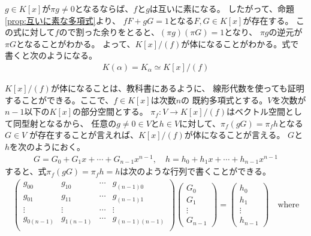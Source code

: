{	$g\in K[x]$が$\pi g\neq 0$となるならば、$f$と$g$は互いに素になる。
	したがって、命題\ref{prop:互いに素な多項式}より、
	$fF+gG=1$となる$F,G\in K[x]$が存在する。
	この式に対して$f$ので割った余りをとると、$(\pi g)(\pi G)=1$となり、
	$\pi g$の逆元が$\pi G$となることがわかる。
	よって、$K[x]/(f)$が体になることがわかる。式で書くと次のようになる。
	\begin{equation*}\begin{split}
		K(\alpha)=K_\alpha\simeq K[x]/(f)
	\end{split}\end{equation*}

	$K[x]/(f)$が体になることは、教科書\cite{artin1959}にあるように、
	線形代数を使っても証明することができる。ここで、$f\in K[x]$は次数$n$の
	既約多項式とする。$V$を次数が$n-1$以下の$K[x]$の部分空間とする。
	$\pi_f:V\to K[x]/(f)$はベクトル空間として同型射となるから、
	任意の$g\neq0\in V$と$h\in V$に対して、$\pi_f(gG)=\pi_fh$となる$G\in V$
	が存在することが言えれば、$K[x]/(f)$が体になることが言える。
	$G$と$h$を次のようにおく。
	\begin{equation*}\begin{split}
		G = G_0 + G_1x +\cdots+ G_{n-1}x^{n-1},\quad
		h = h_0 + h_1x +\cdots+ h_{n-1}x^{n-1}
	\end{split}\end{equation*}
	すると、式$\pi_f(gG)=\pi_fh=h$は次のような行列で書くことができる。
	\begin{equation*}\begin{split}
		\begin{pmatrix}
			g_{00} & g_{10} &\cdots& g_{(n-1)0} \\
			g_{01} & g_{11} &\cdots& g_{(n-1)1} \\
			\vdots & \vdots &\cdots& \vdots \\
			g_{0(n-1)} & g_{1(n-1)} &\cdots& g_{(n-1)(n-1)} \\
		\end{pmatrix}\begin{pmatrix}
			G_0 \\ G_1 \\ \vdots \\ G_{n-1}
		\end{pmatrix} = \begin{pmatrix}
			h_0 \\ h_1 \\ \vdots \\ h_{n-1}
		\end{pmatrix} \quad\text{where} \\

\end{split}
\end{equation*}}
